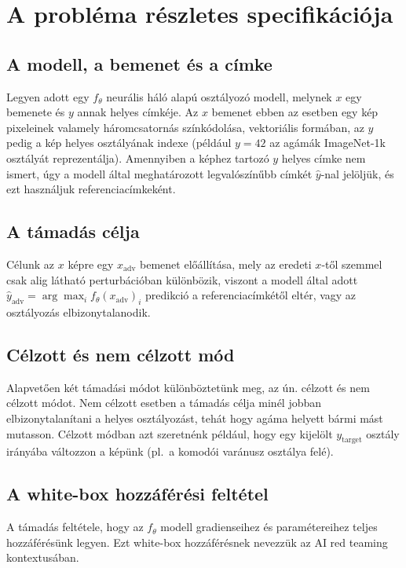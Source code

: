 \section{A probléma részletes specifikációja}

\subsection{A modell, a bemenet és a címke}
Legyen adott egy $f_\theta$ neurális háló alapú osztályozó modell, melynek $x$ egy bemenete és $y$ annak helyes címkéje. 
Az $x$ bemenet ebben az esetben egy kép pixeleinek valamely háromcsatornás színkódolása, vektoriális formában, az $y$ pedig a kép 
helyes osztályának indexe (például $y=42$ az agámák ImageNet-1k osztályát reprezentálja). 
Amennyiben a képhez tartozó $y$ helyes címke nem ismert, úgy a modell által meghatározott legvalószínűbb címkét $\hat{y}$-nal 
jelöljük, és ezt használjuk referenciacímkeként. 

\subsection{A támadás célja}
Célunk az $x$ képre egy $x_{\mathrm{adv}}$ bemenet előállítása, mely az eredeti $x$-től szemmel csak alig látható perturbációban 
különbözik, viszont a modell által adott $\hat{y}_{\mathrm{adv}} = \arg\max_i f_\theta(x_{\mathrm{adv}})_i$ predikció a 
referenciacímkétől eltér, vagy az osztályozás elbizonytalanodik. 

\subsection{Célzott és nem célzott mód}
Alapvetően két támadási módot különböztetünk meg, az ún. célzott és nem célzott módot. 
Nem célzott esetben a támadás célja minél jobban elbizonytalanítani a helyes osztályozást, tehát hogy agáma helyett bármi mást 
mutasson. 
Célzott módban azt szeretnénk például, hogy egy kijelölt $y_{\mathrm{target}}$ osztály irányába változzon a képünk (pl.\ a komodói 
varánusz osztálya felé). 

\subsection{A white-box hozzáférési feltétel}
A támadás feltétele, hogy az $f_\theta$ modell gradienseihez és paramétereihez teljes hozzáférésünk legyen. 
Ezt white-box hozzáférésnek nevezzük az AI red teaming kontextusában. 

